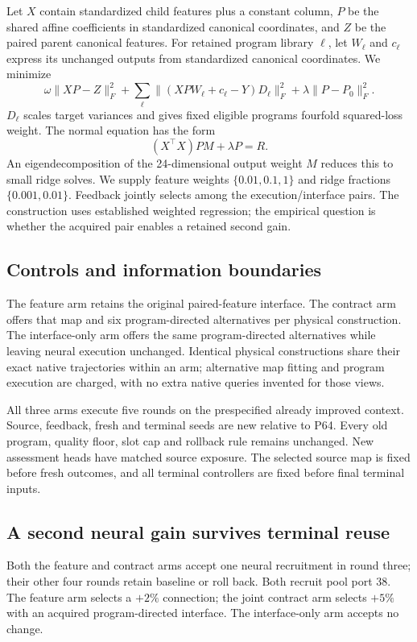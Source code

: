 \documentclass[11pt]{article}
\begin{document}
Let $X$ contain standardized child features plus a constant column, $P$ be the shared affine coefficients in standardized canonical coordinates, and $Z$ be the paired parent canonical features. For retained program library $\ell$, let $W_\ell$ and $c_\ell$ express its unchanged outputs from standardized canonical coordinates. We minimize
\begin{equation}
 \omega\|XP-Z\|_F^2+
 \sum_\ell\|(XPW_\ell+c_\ell-Y)D_\ell\|_F^2+
 \lambda\|P-P_0\|_F^2.
\end{equation}
$D_\ell$ scales target variances and gives fixed eligible programs fourfold squared-loss weight. The normal equation has the form
\begin{equation}
 (X^\top X)PM+\lambda P=R.
\end{equation}
An eigendecomposition of the 24-dimensional output weight $M$ reduces this to small ridge solves. We supply feature weights $\{0.01,0.1,1\}$ and ridge fractions $\{0.001,0.01\}$. Feedback jointly selects among the execution/interface pairs. The construction uses established weighted regression; the empirical question is whether the acquired pair enables a retained second gain.

\subsection{Controls and information boundaries}
The feature arm retains the original paired-feature interface. The contract arm offers that map and six program-directed alternatives per physical construction. The interface-only arm offers the same program-directed alternatives while leaving neural execution unchanged. Identical physical constructions share their exact native trajectories within an arm; alternative map fitting and program execution are charged, with no extra native queries invented for those views.

All three arms execute five rounds on the prespecified already improved context. Source, feedback, fresh and terminal seeds are new relative to P64. Every old program, quality floor, slot cap and rollback rule remains unchanged. New assessment heads have matched source exposure. The selected source map is fixed before fresh outcomes, and all terminal controllers are fixed before final terminal inputs.

\subsection{A second neural gain survives terminal reuse}
Both the feature and contract arms accept one neural recruitment in round three; their other four rounds retain baseline or roll back. Both recruit pool port 38. The feature arm selects a $+2\%$ connection; the joint contract arm selects $+5\%$ with an acquired program-directed interface. The interface-only arm accepts no change.
\end{document}
